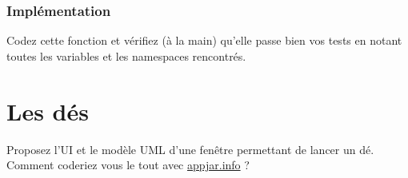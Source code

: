 \documentclass[12pt]{article}
\begin{document}
\subsubsection{Implémentation}

Codez cette fonction et vérifiez (à la main) qu'elle passe bien vos tests en notant toutes les variables et les namespaces rencontrés.


    
    \section{Les dés}
    
    Proposez l'UI et le modèle UML d'une fenêtre permettant de lancer un dé. Comment coderiez vous le tout avec \url{appjar.info} ?
    
    
\end{document}
